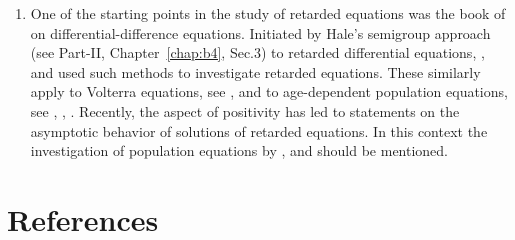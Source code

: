 \begin{enumerate}[label=\emph{Section \arabic*:}, wide, itemsep=1ex]
It is well-known that semigroups play an important role in probability theory (\eg see \textcite{dynkin:1965}, \textcite{feller:1952} and \textcite{hillephillips:1957}).
A more detailed discussion than Example~\ref{ex:c4-2.8} is given in Chapter~2 of \textcite{vancasteren:1985}.

Convergence to periodic solutions is investigated in \textcite{kerschernagel:1984} and \textcite{nagel:1984} where Proposition~\ref{prop:c4-2.13} is proved.
The equation considered in Example~\ref{ex:c4-2.15} describes a linear model for cell division with exponential growth of individual cells.
The occurring phenomena are conjectured by \textcite{diekmannetal:1984}.

\item%
One of the starting points in the study of retarded equations was the book of \textcite{bellmancooke:1963} on differential-difference equations.
Initiated by Hale's semigroup approach (see Part-II, Chapter~\ref{chap:b4},  Sec.3) to retarded differential equations, \textcite{dysonvillella:1979}, \textcite{villellabressan:1985} and \textcite{webb:1977} used such methods to investigate retarded equations.
These similarly apply to Volterra equations, see \textcite{miller:1974}, \textcite{webb:1977} and to 
age-dependent population equations, see \textcite{pruess:1981}, \textcite{webb:1984}, \textcite{webb:1985a}.
Recently, the aspect of positivity has led to statements on the asymptotic behavior of solutions of retarded equations.
In this context the investigation of population equations by \textcite{greiner:1984}, \textcite{heijmans:1985a} and \textcite{webb:1985b} should be mentioned.

\end{enumerate}
\section*{References}
{\RaggedRight
  \printbibliography[heading=none]
 }